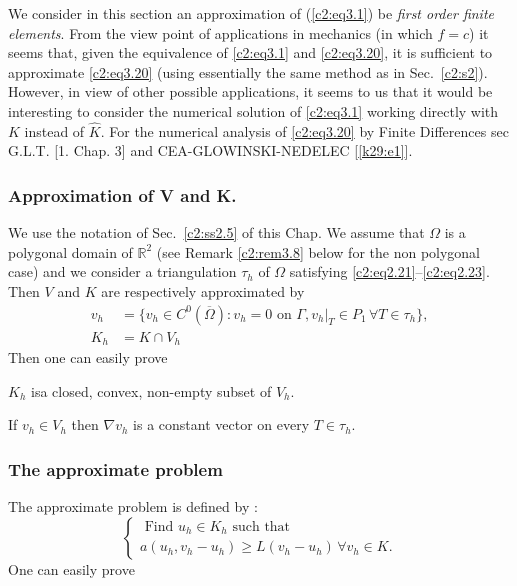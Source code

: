  We consider in this section an approximation of (\ref{c2:eq3.1}) be 
\textit{first order finite elements}. From  the view point of applications
 in mechanics (in which $f = c$) it seems that, given the equivalence
 of \eqref{c2:eq3.1} and \eqref{c2:eq3.20}, it is sufficient to
 approximate 
 \eqref{c2:eq3.20} (using
 essentially the same method as in Sec.~\ref{c2:s2}). However, in  view of other
 possible applications, it seems to us that it would be interesting to
 consider the numerical solution  of \eqref{c2:eq3.1} working directly with $K$
 instead of $\hat{K}$. For the numerical analysis of \eqref{c2:eq3.20} by Finite
 Differences sec G.L.T. [1. Chap. 3] and CEA-GLOWINSKI-NEDELEC [\ref{k29:e1}]. 
 
 \subsubsection{Approximation of V and K.}\label{c2:sss3.5.1}%
 
 We use the notation of Sec.~\ref{c2:ss2.5} of this Chap. We assume that $\Omega$
 is a polygonal domain of $\mathbb{R}^2$ (see Remark  \ref{c2:rem3.8} below for
 the non polygonal case) and we consider a triangulation $\tau_h$ of
 $\Omega$ satisfying \eqref{c2:eq2.21}--\eqref{c2:eq2.23}. Then $V $
 and $K$ are respectively approximated by  
 \begin{align*}
v_h  &= \{v_h \in C^0 (\overline{\Omega}) : v_h = 0 \text{ on }
\Gamma, v_h | _T \in P_1\, \forall  T \in \tau_h \},\\ 
K_h & = K \cap V_h
\end{align*}
Then one can easily prove

\begin{proposition}\label{c2:prop3.3}%
$K_h$ is\pageoriginale  a closed, convex, non-empty subset of $V_h$.
\end{proposition}

\begin{remark}\label{c2:rem3.6}%
If $v_h \in V_h$ then $\nabla v_h$ is a constant vector
on every $T \in \tau_h$. 
\end{remark}

\subsubsection{The approximate problem}\label{c2:sss3.5.2}%

The approximate problem is defined by : 
\begin{equation}
\begin{cases}
\text{ Find } u_h \in K_h \text{ such that }\\
a (u_h, v_h - u_h) \geq L (v_h - u_h)\, \forall  v_h \in
K.\tag{3.22}\label{c2:eq3.22}  
\end{cases}
\end{equation} 
One can easily prove

